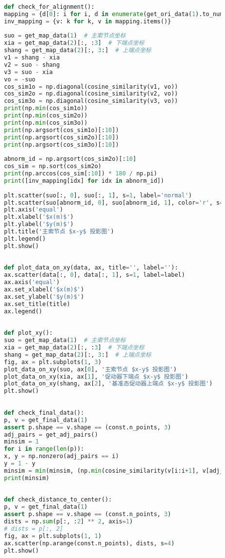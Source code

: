 \documentclass[withoutpreface,bwprint,fontset=macnew]{cumcmthesis} %
\begin{document}
\begin{appendices}
\begin{lstlisting}[language=python]
		
		def check_for_alignment():
		mapping = {d[0]: i for i, d in enumerate(get_ori_data(1).to_numpy())}
		inv_mapping = {v: k for k, v in mapping.items()}
		
		suo = get_map_data(1)  # 主索节点坐标
		xia = get_map_data(2)[:, :3]  # 下端点坐标
		shang = get_map_data(2)[:, 3:]  # 上端点坐标
		v1 = shang - xia
		v2 = suo - shang
		v3 = suo - xia
		vo = -suo
		cos_sim1o = np.diagonal(cosine_similarity(v1, vo))
		cos_sim2o = np.diagonal(cosine_similarity(v2, vo))
		cos_sim3o = np.diagonal(cosine_similarity(v3, vo))
		print(np.min(cos_sim1o))
		print(np.min(cos_sim2o))
		print(np.min(cos_sim3o))
		print(np.argsort(cos_sim1o)[:10])
		print(np.argsort(cos_sim2o)[:10])
		print(np.argsort(cos_sim3o)[:10])
		
		abnorm_id = np.argsort(cos_sim2o)[:10]
		cos_sim = np.sort(cos_sim2o)
		print(np.arccos(cos_sim[:10]) * 180 / np.pi)
		print([inv_mapping[idx] for idx in abnorm_id])
		
		plt.scatter(suo[:, 0], suo[:, 1], s=1, label='normal')
		plt.scatter(suo[abnorm_id, 0], suo[abnorm_id, 1], color='r', s=4, label='abnormal')
		plt.axis('equal')
		plt.xlabel('$x(m)$')
		plt.ylabel('$y(m)$')
		plt.title('主索节点 $x-y$ 投影图')
		plt.legend()
		plt.show()
		
		
		def plot_data_on_xy(data, ax, title='', label=''):
		ax.scatter(data[:, 0], data[:, 1], s=1, label=label)
		ax.axis('equal')
		ax.set_xlabel('$x(m)$')
		ax.set_ylabel('$y(m)$')
		ax.set_title(title)
		ax.legend()
		
		
		def plot_xy():
		suo = get_map_data(1)  # 主索节点坐标
		xia = get_map_data(2)[:, :3]  # 下端点坐标
		shang = get_map_data(2)[:, 3:]  # 上端点坐标
		fig, ax = plt.subplots(1, 3)
		plot_data_on_xy(suo, ax[0], '主索节点 $x-y$ 投影图')
		plot_data_on_xy(xia, ax[1], '促动器下端点 $x-y$ 投影图')
		plot_data_on_xy(shang, ax[2], '基准态促动器上端点 $x-y$ 投影图')
		plt.show()
		
		
		def check_final_data():
		p, v = get_final_data(1)
		assert p.shape == v.shape == (const.n_points, 3)
		adj_pairs = get_adj_pairs()
		minsim = 1
		for i in range(len(p)):
		x, y = np.nonzero(adj_pairs == i)
		y = 1 - y
		minsim = min(minsim, (np.min(cosine_similarity(v[i:i+1], v[adj_pairs[x, y]]))))
		print(minsim)
		
		
		def check_distance_to_center():
		p, v = get_final_data(1)
		assert p.shape == v.shape == (const.n_points, 3)
		dists = np.sum(p[:, :2] ** 2, axis=1)
		# dists = p[:, 2]
		fig, ax = plt.subplots(1, 1)
		ax.scatter(np.arange(const.n_points), dists, s=4)
		plt.show()
		

\end{lstlisting}
\end{appendices}
\end{document}
